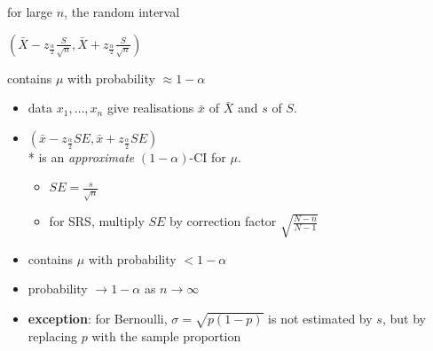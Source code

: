 \documentclass[10pt, landscape]{article}
\newcommand{\xbar}{\bar{x}}
\newcommand{\Xbar}{\bar{X}}
\newcommand{\seq}[2][n]{#2_1, \dots, #2_{#1}}
\begin{document}
\begin{multicols*}{4}
  \begin{tightcenter}
    for large $n$, the random interval

    \( {\displaystyle{ \left( \Xbar-z_{\frac{\alpha}{2}}\frac{S}{\sqrt n}, \Xbar+z_{\frac{\alpha}{2}}\frac{S}{\sqrt n} \right) }} \) 

    contains $\mu$ with probability $\approx 1-\alpha$
  \end{tightcenter}

  \begin{itemize}
    \item data $\seq{x}$ give realisations $\xbar$ of $\Xbar$ and $s$ of $S$.
    \item $ \left( \xbar-z_{\frac{\alpha}{2}}SE, \xbar+z_{\frac{\alpha}{2}}SE \right) $ \\* is an \textit{approximate} $(1-\alpha)$-CI for $\mu$.
      \begin{itemize}
        \item $SE = \frac{s}{\sqrt n}$
        \item for SRS, multiply $SE$ by correction factor $\sqrt{\frac{N-n}{N-1}}$
      \end{itemize}
    \item contains $\mu$ with probability $<1-\alpha$
    \item probability $\to 1-\alpha$ as $n \to \infty$
    \item \textbf{exception}: for Bernoulli, $\sigma = \sqrt{p(1-p)}$ is not estimated by $s$, but by replacing $p$ with the sample proportion
  \end{itemize}











\end{multicols*}
\end{document}
